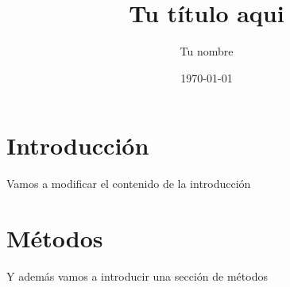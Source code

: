 \documentclass{article}
\title{Tu título aqui}
\author{Tu nombre}
\date{\today}
\begin{document}
\maketitle

\section{Introducción}

Vamos a modificar el contenido de la introducción

\section {Métodos}

Y además vamos a introducir una sección de métodos
\end{document}

